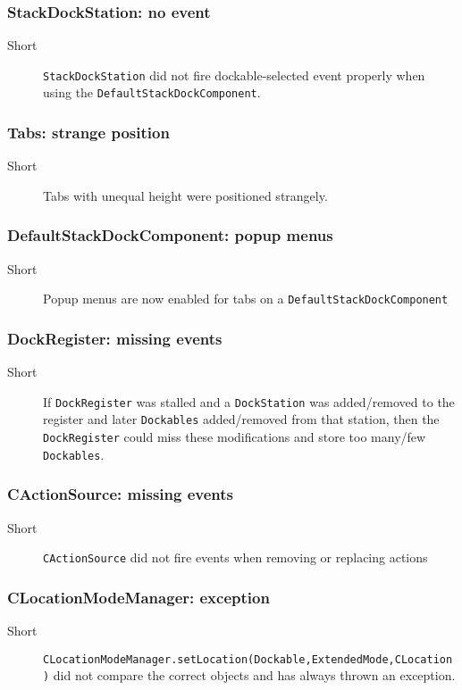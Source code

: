 \documentclass[a4paper,10pt]{article}
\newcommand{\src}[1]{\lstinline[basicstyle=\normalsize\ttfamily,keywordstyle=\normalsize\ttfamily,identifierstyle=\normalsize\ttfamily]|#1|}
\newcommand{\short}{\item[Short]}
\begin{document}
\subsubsection{StackDockStation: no event}
\begin{description}
 \short \src{StackDockStation} did not fire dockable-selected event properly when using the \src{DefaultStackDockComponent}.
\end{description}

\subsubsection{Tabs: strange position}
\begin{description}
 \short Tabs with unequal height were positioned strangely.
\end{description}

\subsubsection{DefaultStackDockComponent: popup menus}
\begin{description}
 \short Popup menus are now enabled for tabs on a \src{DefaultStackDockComponent}
\end{description}

\subsubsection{DockRegister: missing events}
\begin{description}
 \short If \src{DockRegister} was stalled and a \src{DockStation} was added/removed to the register and later \src{Dockables} added/removed from that station, then the \src{DockRegister} could miss these modifications and store too many/few \src{Dockables}.
\end{description}


\subsubsection{CActionSource: missing events}
\begin{description}
 \short \src{CActionSource} did not fire events when removing or replacing actions
\end{description}
 
\subsubsection{CLocationModeManager: exception}
\begin{description}
 \short \src{CLocationModeManager.setLocation(Dockable,ExtendedMode,CLocation)} did not compare the correct objects and has always thrown an exception.
\end{description}
\end{document}
